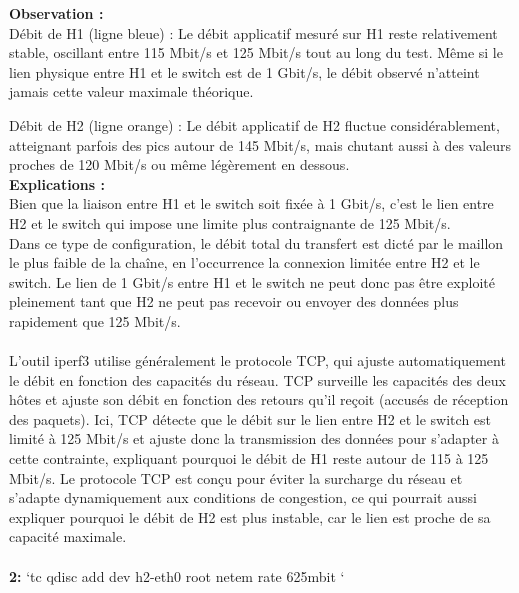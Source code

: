 \textbf{Observation :}\\
Débit de H1 (ligne bleue) : Le débit applicatif mesuré sur H1 reste relativement stable, oscillant entre 115 Mbit/s et 125 Mbit/s tout au long du test. Même si le lien physique entre H1 et le switch est de 1 Gbit/s, le débit observé n’atteint jamais cette valeur maximale théorique.

Débit de H2 (ligne orange) : Le débit applicatif de H2 fluctue considérablement, atteignant parfois des pics autour de 145 Mbit/s, mais chutant aussi à des valeurs proches de 120 Mbit/s ou même légèrement en dessous.
\vspace{1cm}
\\
\textbf{Explications :} 
\\
Bien que la liaison entre H1 et le switch soit fixée à 1 Gbit/s, c'est le lien entre H2 et le switch qui impose une limite plus contraignante de 125 Mbit/s.\\
Dans ce type de configuration, le débit total du transfert est dicté par le maillon le plus faible de la chaîne, en l’occurrence la connexion limitée entre H2 et le switch. Le lien de 1 Gbit/s entre H1 et le switch ne peut donc pas être exploité pleinement tant que H2 ne peut pas recevoir ou envoyer des données plus rapidement que 125 Mbit/s.\\
\\
L'outil iperf3 utilise généralement le protocole TCP, qui ajuste automatiquement le débit en fonction des capacités du réseau. TCP surveille les capacités des deux hôtes et ajuste son débit en fonction des retours qu’il reçoit (accusés de réception des paquets).
Ici, TCP détecte que le débit sur le lien entre H2 et le switch est limité à 125 Mbit/s et ajuste donc la transmission des données pour s’adapter à cette contrainte, expliquant pourquoi le débit de H1 reste autour de 115 à 125 Mbit/s.
Le protocole TCP est conçu pour éviter la surcharge du réseau et s’adapte dynamiquement aux conditions de congestion, ce qui pourrait aussi expliquer pourquoi le débit de H2 est plus instable, car le lien est proche de sa capacité maximale.\\
\\
\textbf{2:} `tc qdisc add dev h2-eth0 root netem rate 625mbit `
